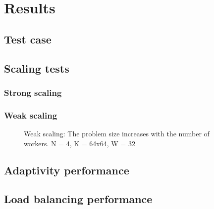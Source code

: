 \chapter{Results} \label{chapter:results}

\section{Test case} \label{section:results:test_case}

\section{Scaling tests} \label{section:results:scaling_tests}

\subsection{Strong scaling} \label{section:results:scaling_tests:strong}

\subsection{Weak scaling} \label{section:results:scaling_tests:weak}


\begin{figure}[H]
	\centering
	
	\caption{Weak scaling: The problem size increases with the number of workers. N = 4, K = 64x64, W = 32}
	\label{fig:weak_scaling}
\end{figure}

\section{Adaptivity performance} \label{section:results:adaptivity_performance}

\section{Load balancing performance} \label{section:results:load_balancing_performance}
